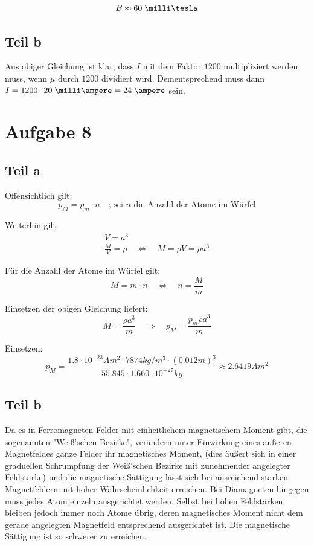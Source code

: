 \documentclass[a4paper,german,12pt,smallheadings]{scrartcl}
\begin{document}
\begin{align*}
  B \approx 60 \;\milli\tesla
\end{align*}

\subsection*{Teil b}
Aus obiger Gleichung ist klar, dass $I$ mit dem Faktor $1200$ multipliziert
werden muss, wenn $\mu$ durch $1200$ dividiert wird. Dementsprechend muss dann
$I = 1200 \cdot 20\;\milli\ampere = 24\;\ampere$ sein.


\section*{Aufgabe 8}
\subsection*{Teil a}

Offensichtlich gilt:
\begin{equation*}
p_M=p_m \cdot n \quad \text{; sei $n$ die Anzahl der Atome im Würfel}
\end{equation*}

Weiterhin gilt:
\begin{align*}
V=a^3\\
\frac{M}{V}=\rho \quad \Leftrightarrow \quad M=\rho V = \rho a^3
\end{align*}

Für die Anzahl der Atome im Würfel gilt:
\begin{equation*}
M=m\cdot n \quad \Leftrightarrow \quad n=\frac{M}{m}
\end{equation*}

Einsetzen der obigen Gleichung liefert:
\begin{equation*}
M=\frac{\rho a^3}{m} \quad \Rightarrow \quad p_M=\frac{p_m \rho a^3}{m}
\end{equation*}

Einsetzen:
\begin{equation*}
p_M=\frac{1.8 \cdot 10^{-23}Am^2 \cdot 7874 kg/m^3 \cdot (0.012m)^3}{55.845 \cdot 1.660 \cdot 10^{-27}kg} \approx 2.6419 Am^2
\end{equation*}

\subsection*{Teil b}
Da es in Ferromagneten Felder mit einheitlichem magnetischem Moment gibt, die
sogenannten "Weiß'schen Bezirke", verändern unter Einwirkung eines äußeren
Magnetfeldes ganze Felder ihr magnetisches Moment, (dies äußert sich in einer
graduellen Schrumpfung der Weiß'schen Bezirke mit zunehmender angelegter
Feldstärke) und die magnetische Sättigung lässt sich bei ausreichend starken
Magnetfeldern mit hoher Wahrscheinlichkeit erreichen.  Bei Diamagneten hingegen
muss jedes Atom einzeln ausgerichtet werden. Selbst bei hohen Feldstärken
bleiben jedoch immer noch Atome übrig, deren magnetisches Moment nicht dem
gerade angelegten Magnetfeld entsprechend ausgerichtet ist. Die magnetische
Sättigung ist so schwerer zu erreichen.
\end{document}
